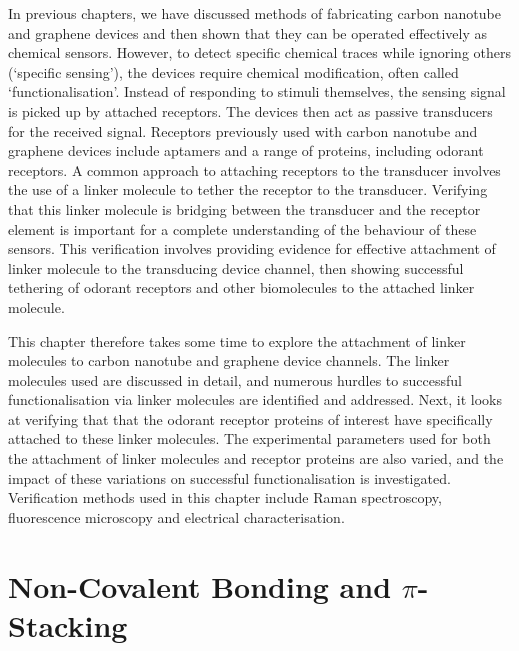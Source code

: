 \documentclass[
  a4paper,
]{scrbook}
\begin{document}
In previous chapters, we have discussed methods of fabricating carbon
nanotube and graphene devices and then shown that they can be operated
effectively as chemical sensors. However, to detect specific chemical
traces while ignoring others (`specific sensing'), the devices require
chemical modification, often called `functionalisation'. Instead of
responding to stimuli themselves, the sensing signal is picked up by
attached receptors. The devices then act as passive transducers for the
received signal. Receptors previously used with carbon nanotube and
graphene devices include aptamers and a range of proteins, including
odorant receptors. A common approach to attaching receptors to the
transducer involves the use of a linker molecule to tether the receptor
to the transducer. Verifying that this linker molecule is bridging
between the transducer and the receptor element is important for a
complete understanding of the behaviour of these sensors. This
verification involves providing evidence for effective attachment of
linker molecule to the transducing device channel, then showing
successful tethering of odorant receptors and other biomolecules to the
attached linker molecule.

This chapter therefore takes some time to explore the attachment of
linker molecules to carbon nanotube and graphene device channels. The
linker molecules used are discussed in detail, and numerous hurdles to
successful functionalisation via linker molecules are identified and
addressed. Next, it looks at verifying that that the odorant receptor
proteins of interest have specifically attached to these linker
molecules. The experimental parameters used for both the attachment of
linker molecules and receptor proteins are also varied, and the impact
of these variations on successful functionalisation is investigated.
Verification methods used in this chapter include Raman spectroscopy,
fluorescence microscopy and electrical characterisation.

\hypertarget{non-covalent-bonding-and-pi-stacking}{%
\section{\texorpdfstring{Non-Covalent Bonding and
\(\pi\)-Stacking}{Non-Covalent Bonding and \textbackslash pi-Stacking}}\label{non-covalent-bonding-and-pi-stacking}}
\end{document}
